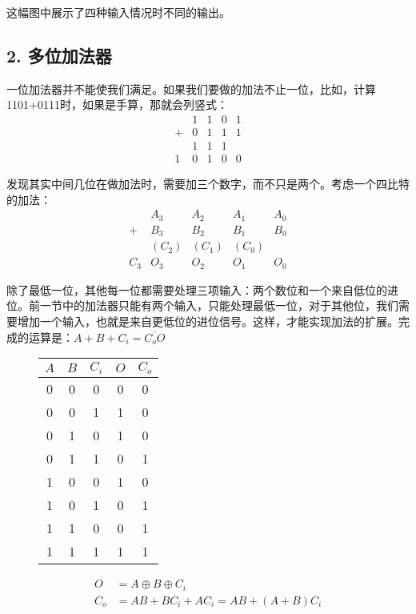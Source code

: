 \documentclass[UTF8]{ctexart}
\begin{document}
这幅图中展示了四种输入情况时不同的输出。

\subsection*{2. 多位加法器}

一位加法器并不能使我们满足。如果我们要做的加法不止一位，比如，计算1101+0111时，如果是手算，那就会列竖式：
\[\begin{matrix} &1&1&0&1\\ +&0&1&1&1\\ &{\scriptstyle 1}&{\scriptstyle 1}&{\scriptstyle 1}\\ \hline 1&0&1&0&0 \end{matrix}\]

发现其实中间几位在做加法时，需要加三个数字，而不只是两个。考虑一个四比特的加法：
\[\begin{matrix} &A_3&A_2&A_1&A_0\\ +&B_3&B_2&B_1&B_0\\ &{\scriptstyle(C_2)}&\scriptstyle(C_1)&\scriptstyle(C_0)\\ \hline C_3&O_3&O_2&O_1&O_0 \end{matrix}\]

除了最低一位，其他每一位都需要处理三项输入：两个数位和一个来自低位的进位。前一节中的加法器只能有两个输入，只能处理最低一位，对于其他位，我们需要增加一个输入，也就是来自更低位的进位信号。这样，才能实现加法的扩展。完成的运算是：$A+B+C_i=\overline{C_oO}$
\begin{figure}
    \begin{tabular}{|c|c|c|c|c|}\hline\rowcolor{lightgray}
        $A$&$B$&$C_i$&$O$&$C_o$\\\hline
        0&0&0&0&0\\\hline
        0&0&1&1&0\\\hline
        0&1&0&1&0\\\hline
        0&1&1&0&1\\\hline
        1&0&0&1&0\\\hline
        1&0&1&0&1\\\hline
        1&1&0&0&1\\\hline
        1&1&1&1&1\\\hline
    \end{tabular}
\end{figure}
\[\begin{aligned} O&=A\oplus B\oplus C_i\\ C_o&=AB+BC_i+AC_i=AB+(A+B)C_i \end{aligned}\]
\end{document}
